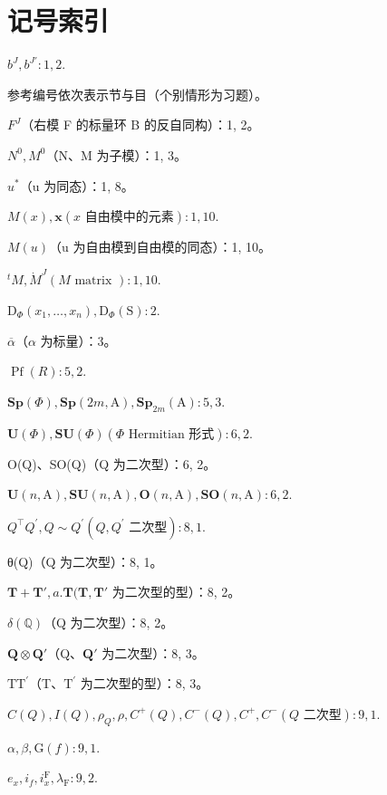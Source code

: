 \chapter*{记号索引}
{}

\(b^{J}, b^{J'} : 1, 2.\)

参考编号依次表示节与目（个别情形为习题）。

\(F^{J}\)（右模 F 的标量环 B 的反自同构）：1, 2。

\(N^{0}, M^{0}\)（N、M 为子模）：1, 3。

\(u^{*}\)（u 为同态）：1, 8。

\(M(x), \mathbf{x} (x \text{ 自由模中的元素}) : 1, 10.\)

\(M(u)\)（u 为自由模到自由模的同态）：1, 10。

\(^{t}M, \dot{M}^{J} (M \text { matrix } ): 1, 10.\)

\(\mathrm{D}_{\Phi}(x_{1},\ldots ,x_{n}),\mathrm{D}_{\Phi}(\mathrm{S}):2.\)

\(\overline{\alpha}\)（\(\alpha\) 为标量）：3。

\(\operatorname{Pf}(R):5,2.\)

\(\mathbf{Sp}(\Phi), \mathbf{Sp}(2m, \mathrm{A}), \mathbf{Sp}_{2m}(\mathrm{A}) : 5, 3.\)

\(\mathbf{U}(\Phi), \mathbf{S}\mathbf{U}(\Phi) (\Phi \text{ Hermitian 形式}) : 6, 2.\)

O(Q)、SO(Q)（Q 为二次型）：6, 2。

\(\mathbf{U}(n,\mathrm{A}),\mathbf{S}\mathbf{U}(n,\mathrm{A}),\mathbf{O}(n,\mathrm{A}),\mathbf{SO}(n,\mathrm{A}):6,2.\)

\(Q^{\top}Q^{\prime}, Q \sim Q^{\prime}(Q, Q^{\prime}\text{ 二次型}): 8, 1.\)

θ(Q)（Q 为二次型）：8, 1。

\(\mathbf{T} + \mathbf{T}', a. \mathbf{T} (\mathbf{T}, \mathbf{T}'\) 为二次型的型）：8, 2。

\(\delta (\mathbb{Q})\)（Q 为二次型）：8, 2。

\(\mathbf{Q} \otimes \mathbf{Q}'\)（Q、\(\mathbf{Q}'\) 为二次型）：8, 3。

\(\mathrm{TT}^{\prime}\)（T、\(\mathrm{T}^{\prime}\) 为二次型的型）：8, 3。

\(C(Q), I(Q), \rho_{Q}, \rho, C^{+}(Q), C^{-}(Q), C^{+}, C^{-} (Q \text{ 二次型}): 9, 1.\)

\(\alpha, \beta, \mathrm{G}(f): 9, 1.\)

\(e_x, i_f, i_x^{\mathrm{F}}, \lambda_{\mathrm{F}}: 9, 2.\)


